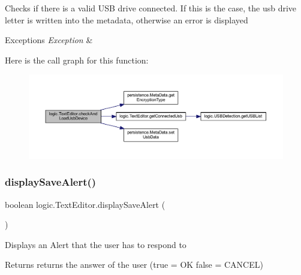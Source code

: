 Checks if there is a valid U\+SB drive connected. If this is the case, the usb drive letter is written into the metadata, otherwise an error is displayed 
\begin{DoxyExceptions}{Exceptions}
{\em Exception} & \\
\hline
\end{DoxyExceptions}
Here is the call graph for this function\+:\nopagebreak
\begin{figure}[H]
\begin{center}
\leavevmode
\includegraphics[width=350pt]{classlogic_1_1_text_editor_aa70bd7664e38609c8a3697ecb39795b5_cgraph}
\end{center}
\end{figure}
\mbox{\label{classlogic_1_1_text_editor_aed9266aefb6a34921fdb12776a4c84cc}} 
\subsubsection{\texorpdfstring{display\+Save\+Alert()}{displaySaveAlert()}}
{\footnotesize\ttfamily boolean logic.\+Text\+Editor.\+display\+Save\+Alert (\begin{DoxyParamCaption}{ }\end{DoxyParamCaption})\hspace{0.3cm}{\ttfamily [private]}}

Displays an Alert that the user has to respond to \begin{DoxyReturn}{Returns}
returns the answer of the user (true = OK false = C\+A\+N\+C\+EL) 
\end{DoxyReturn}
\mbox{\label{classlogic_1_1_text_editor_abc9623f0e47f9ffaf55f6489ef2965f4}} 
